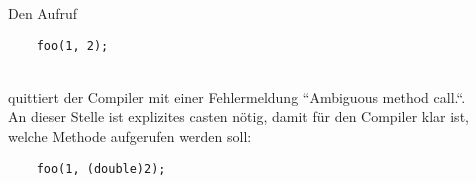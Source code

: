 Den Aufruf

\begin{verbatim}
    foo(1, 2);
\end{verbatim}\\

quittiert der Compiler mit einer Fehlermeldung ``Ambiguous method call.``.\\
An dieser Stelle ist explizites casten nötig, damit für den Compiler klar ist, welche Methode aufgerufen werden soll:

\begin{verbatim}
    foo(1, (double)2);
\end{verbatim}\\